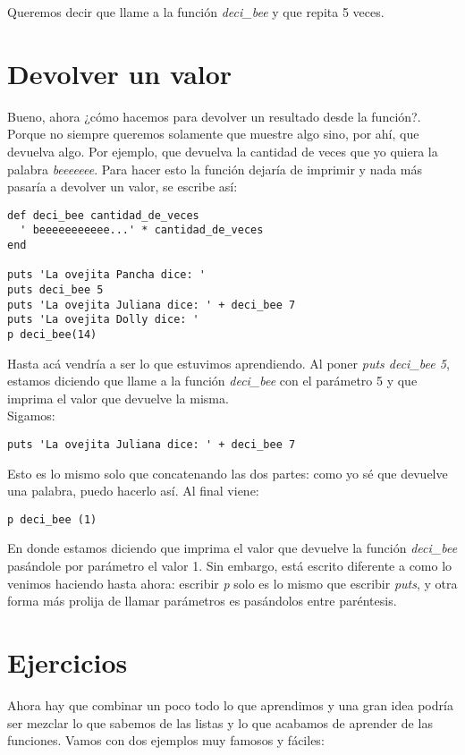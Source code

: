 Queremos decir que llame a la función \emph{deci\_bee} y que repita 5 veces.

\section{Devolver un valor}
Bueno, ahora ¿cómo hacemos para devolver un resultado desde la función?. Porque no siempre queremos solamente que muestre algo sino, por ahí, que devuelva algo. Por ejemplo, que devuelva la cantidad de veces que yo quiera la palabra \emph{beeeeeee}. Para hacer esto la función dejaría de imprimir y nada más pasaría a devolver un valor, se escribe así:

\begin{lstlisting}
def deci_bee cantidad_de_veces
  ' beeeeeeeeeee...' * cantidad_de_veces
end

puts 'La ovejita Pancha dice: ' 
puts deci_bee 5
puts 'La ovejita Juliana dice: ' + deci_bee 7
puts 'La ovejita Dolly dice: ' 
p deci_bee(14)
\end{lstlisting}

Hasta acá vendría a ser lo que estuvimos aprendiendo. Al poner \emph{puts deci\_bee 5}, estamos diciendo que llame a la función \emph{deci\_bee} con el parámetro 5 y que imprima el valor que devuelve la misma.\\

Sigamos:
\begin{lstlisting}
puts 'La ovejita Juliana dice: ' + deci_bee 7
\end{lstlisting}

Esto es lo mismo solo que concatenando las dos partes: como yo sé que devuelve una palabra, puedo hacerlo así. Al final viene:

\begin{lstlisting}
p deci_bee (1)
\end{lstlisting}

En donde estamos diciendo que imprima el valor que devuelve la función \emph{deci\_bee} pasándole por parámetro el valor 1. Sin embargo, está escrito diferente a como lo venimos haciendo hasta ahora: escribir \emph{p} solo es lo mismo que escribir \emph{puts}, y otra forma más prolija de llamar parámetros es pasándolos entre paréntesis.

\section{Ejercicios}
Ahora hay que combinar un poco todo lo que aprendimos y una gran idea podría ser mezclar lo que sabemos de las listas y lo que acabamos de aprender de las funciones. Vamos con dos ejemplos muy famosos y fáciles:

